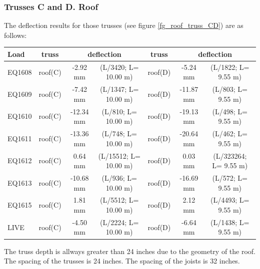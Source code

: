\subsubsection{Trusses C and D. Roof}
The deflection results for those trusses (see figure \ref{fg_roof_truss_CD}) are as follows:

\begin{center}
  \begin{scriptsize}
  \begin{tabular}{|l|c|c|c|c|c|c|}
    \hline
    \textbf{Load} & \textbf{truss} & \multicolumn{2}{c|}{\textbf{deflection}} & \textbf{truss} & \multicolumn{2}{c|}{\textbf{deflection}} \\
    \hline
EQ1608 & roof(C) & -2.92 mm & (L/3420; L= 10.00 m) & roof(D) & -5.24 mm & (L/1822; L= 9.55 m) \\
EQ1609 & roof(C) & -7.42 mm & (L/1347; L= 10.00 m) & roof(D) & -11.87 mm & (L/803; L= 9.55 m) \\
EQ1610 & roof(C) & -12.34 mm & (L/810; L= 10.00 m) & roof(D) & -19.13 mm & (L/498; L= 9.55 m) \\
EQ1611 & roof(C) & -13.36 mm & (L/748; L= 10.00 m) & roof(D) & -20.64 mm & (L/462; L= 9.55 m) \\
EQ1612 & roof(C) & 0.64 mm & (L/15512; L= 10.00 m) & roof(D) & 0.03 mm & (L/323264; L= 9.55 m) \\
EQ1613 & roof(C) & -10.68 mm & (L/936; L= 10.00 m) & roof(D) & -16.69 mm & (L/572; L= 9.55 m) \\
EQ1615 & roof(C) & 1.81 mm & (L/5512; L= 10.00 m) & roof(D) & 2.12 mm & (L/4493; L= 9.55 m) \\
LIVE & roof(C) & -4.50 mm & (L/2224; L= 10.00 m) & roof(D) & -6.64 mm & (L/1438; L= 9.55 m) \\
\hline
  \end{tabular}
  \end{scriptsize}
\end{center}

\noindent The truss depth is allways greater than 24 inches due to the geometry of the roof. The spacing of the trusses is 24 inches. The spacing of the joists is 32 inches. 

